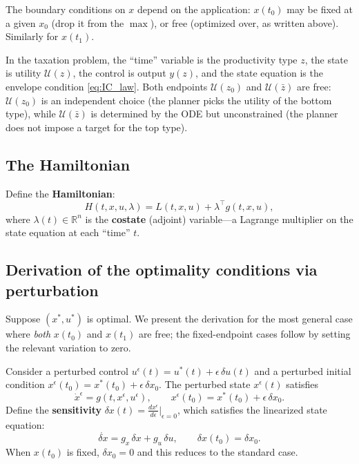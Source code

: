 \documentclass[12pt,a4paper]{article}
\theoremstyle{definition}
\theoremstyle{plain}
\theoremstyle{remark}
\newcommand{\R}{\mathbb{R}}
\newcommand{\zbar}{\bar{z}}
\newcommand{\zlow}{z_{\scriptscriptstyle 0}}
\newcommand{\calU}{\mathcal{U}}
\begin{document}
The boundary conditions on $x$ depend on the application: $x(t_0)$ may be fixed at a given $x_0$ (drop it from the $\max$), or free (optimized over, as written above). Similarly for $x(t_1)$.

In the taxation problem, the ``time'' variable is the productivity type $z$, the state is utility $\calU(z)$, the control is output $y(z)$, and the state equation is the envelope condition \eqref{eq:IC_law}. Both endpoints $\calU(\zlow)$ and $\calU(\zbar)$ are free: $\calU(\zlow)$ is an independent choice (the planner picks the utility of the bottom type), while $\calU(\zbar)$ is determined by the ODE but unconstrained (the planner does not impose a target for the top type).

\subsection{The Hamiltonian}

Define the \textbf{Hamiltonian}:
\begin{equation}
\label{eq:abstract_H}
  H(t, x, u, \lambda) = L(t, x, u) + \lambda^\top g(t, x, u),
\end{equation}
where $\lambda(t) \in \R^n$ is the \textbf{costate} (adjoint) variable---a Lagrange multiplier on the state equation at each ``time'' $t$.

\subsection{Derivation of the optimality conditions via perturbation}

Suppose $(x^*, u^*)$ is optimal. We present the derivation for the most general case where \emph{both} $x(t_0)$ and $x(t_1)$ are free; the fixed-endpoint cases follow by setting the relevant variation to zero.

Consider a perturbed control $u^\epsilon(t) = u^*(t) + \epsilon\, \delta u(t)$ and a perturbed initial condition $x^\epsilon(t_0) = x^*(t_0) + \epsilon\,\delta x_0$. The perturbed state $x^\epsilon(t)$ satisfies
\[
  \dot{x}^\epsilon = g(t, x^\epsilon, u^\epsilon), \qquad x^\epsilon(t_0) = x^*(t_0) + \epsilon\,\delta x_0.
\]
Define the \textbf{sensitivity} $\delta x(t) = \frac{d x^\epsilon}{d\epsilon}\big|_{\epsilon=0}$, which satisfies the linearized state equation:
\begin{equation}
\label{eq:linearized_state}
  \dot{\delta x} = g_x\, \delta x + g_u\, \delta u, \qquad \delta x(t_0) = \delta x_0.
\end{equation}
When $x(t_0)$ is fixed, $\delta x_0 = 0$ and this reduces to the standard case.
\end{document}
